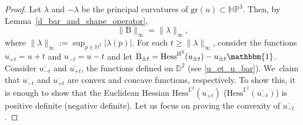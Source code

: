 \documentclass[10pt]{amsart}
\theoremstyle{plain}
\theoremstyle{definition}
\newcommand{\HP}{\mathbb{HP}^3}
\newcommand{\hess}{\mathrm{Hess}^{\mathbb{H}^2}}
\newcommand{\B}{\mathrm{B}}
\begin{document}
\begin{proof}
Let \(\lambda\) and \(-\lambda\) be the principal curvatures of \(\mathrm{gr}(u) \subset \HP\). Then, by Lem\-ma~\ref{d_bar_and_shape_operator},
\[
\lVert \B \rVert_{\infty} = \lVert \lambda \rVert_{\infty},
\]
where \(\lVert \lambda \rVert_{\infty} := \sup_{p \in \mathbb{H}^2} \lvert \lambda(p) \rvert.\)
For each \(t \geq \lVert \lambda \rVert_{\infty} \), consider the functions \(u_{{+t}} = u + t \) and \(u_{{-t}} = u - t \) and let \(\B_{\pm t} = \hess(u_{\pm t}) - u_{\pm t} \mathbbm{1} \). Consider \(\overline{u_{{-t}}} \) and \(\overline{u_{{+t}}} \), the functions defined on \(\mathbb{D}^2 \) (see \eqref{u_et_u_bar}). We~claim that \(\overline{u_{{-t}}} \) and \(\overline{u_{{+t}}} \) are convex and concave functions, respectively. To show this, it is enough to show that the Euclidean Hessian \(\mathrm{Hess}^{\mathbb{E}^2}(\overline{u_{{+t}}}) \) (\resp \(\mathrm{Hess}^{\mathbb{E}^2}(\overline{u_{{-t}}}) \)) is positive definite (\resp negative definite). Let us focus on proving the convexity of \(\overline{u_{{-t}}} \).


\end{proof}
\end{document}
